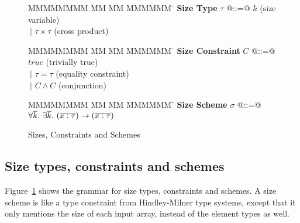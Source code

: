 


\begin{figure}
\begin{tabbing}
MMMMMMMM \= MM  \= MM \= MMMMMM \= \kill
\textbf{Size Type}
\> $\tau$   \> @::=@  \> $k$                  \> (size variable)       \\
\>          \> $~|$   \> $\tau \times \tau$   \> (cross product)
\end{tabbing}

\begin{tabbing}
MMMMMMMM \= MM  \= MM \= MMMMMM \= \kill
\textbf{Size Constraint}
\> $C$      \> @::=@  \> $true$               \> (trivially true)      \\
\>          \> $~|$   \> $\tau = \tau$        \> (equality constraint) \\
\>          \> $~|$   \> $C \wedge C$         \> (conjunction)
\end{tabbing}

\begin{tabbing}
MMMMMMMM \= MM  \= MM \= MMMMMM \= \kill
\textbf{Size Scheme}
\> $\sigma$ \> @::=@  
        \> $\forall \overline{k}.~ \exists \overline{k}.~ (\overline{ x : \tau }) \to (\overline{x : \tau})$
\end{tabbing}

\caption{Sizes, Constraints and Schemes}
\label{f:constraints}
\end{figure}


\newcommand{\constr}[1]{\llbracket #1 \rrbracket}


\subsection{Size types, constraints and schemes}
Figure~\ref{f:constraints} shows the grammar for size types, constraints and schemes. A size scheme is like a type constraint from Hindley-Milner type systems, except that it only mentions the size of each input array, instead of the element types as well.

